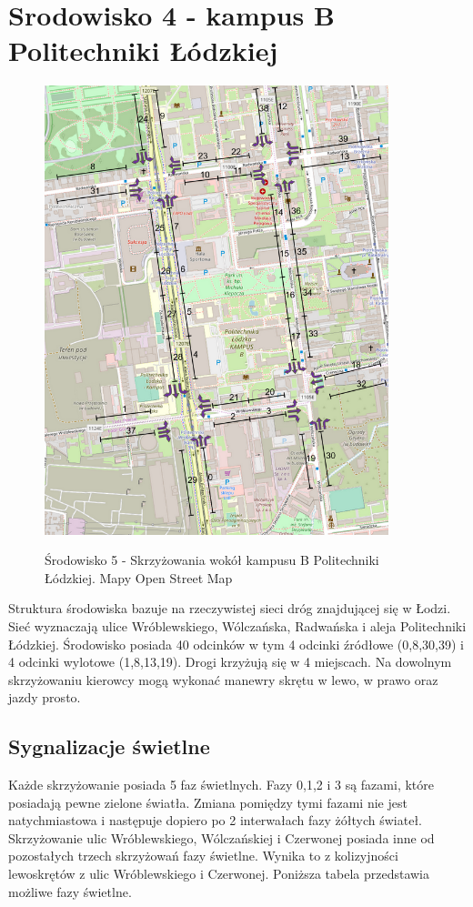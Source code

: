\documentclass[12pt]{book}
\theoremstyle{plain}
\begin{document}
\section{Srodowisko 4 - kampus B Politechniki Łódzkiej}
\begin{figure}[H]
	\centering
	\includegraphics[width=10cm]{images/env_poli}
	\label{fig:env_poli}
	\centering
	\caption{Środowisko 5 - Skrzyżowania wokół kampusu B Politechniki Łódzkiej. Mapy Open Street Map}
\end{figure}
Struktura środowiska bazuje na rzeczywistej sieci dróg znajdującej się w Łodzi. Sieć wyznaczają ulice Wróblewskiego, Wólczańska, Radwańska i aleja Politechniki Łódzkiej. Środowisko posiada 40 odcinków w tym 4 odcinki źródłowe (0,8,30,39) i 4 odcinki wylotowe (1,8,13,19). Drogi krzyżują się w 4 miejscach. Na dowolnym skrzyżowaniu kierowcy mogą wykonać manewry skrętu w lewo, w prawo oraz jazdy prosto. 


\subsection{Sygnalizacje świetlne}
Każde skrzyżowanie posiada 5 faz świetlnych. Fazy 0,1,2 i 3 są fazami, które posiadają pewne zielone światła. Zmiana pomiędzy tymi fazami nie jest natychmiastowa i następuje dopiero po 2 interwałach fazy żółtych świateł. Skrzyżowanie ulic Wróblewskiego, Wólczańskiej i Czerwonej posiada inne od pozostałych trzech skrzyżowań fazy świetlne. Wynika to z kolizyjności lewoskrętów z ulic Wróblewskiego i Czerwonej. Poniższa tabela przedstawia możliwe fazy świetlne.
\end{document}
